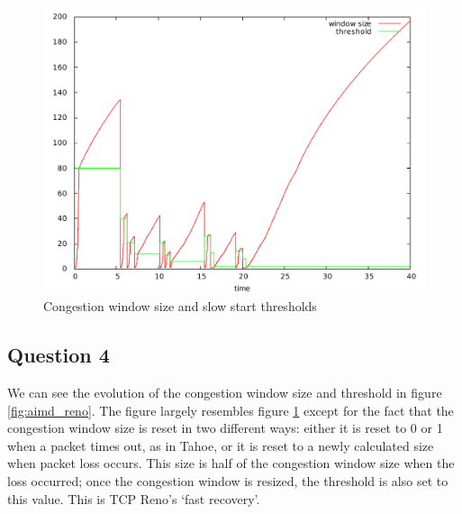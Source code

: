 \documentclass[10pt,a4paper]{article}
\begin{document}
\begin{figure}[p]
    \centering
    \includegraphics[width=\textwidth]{../part2/q2/plots/algorithm.pdf}
    \caption{Congestion window size and slow start thresholds}
    \label{fig:aimd}
\end{figure}



\subsection{Question 4}

We can see the evolution of the congestion window size and threshold
in figure \ref{fig:aimd_reno}. The figure largely resembles figure
\ref{fig:aimd} except for the fact that the congestion window size is
reset in two different ways: either it is reset to 0 or 1 when a packet
times out, as in Tahoe, or it is reset to a newly calculated size
when packet loss occurs. This size is half of the congestion window
size when the loss occurred; once the congestion window is resized,
the threshold is also set to this value. This is TCP Reno's `fast
recovery'.
\end{document}
